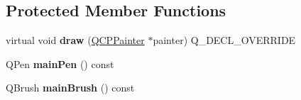 \subsection*{Protected Member Functions}
\begin{DoxyCompactItemize}
\item 
\mbox{\label{classQCPItemTracer_a11f187ffea436434f3b5cfc387811967}} 
virtual void {\bfseries draw} (\hyperlink{classQCPPainter}{Q\+C\+P\+Painter} $\ast$painter) Q\+\_\+\+D\+E\+C\+L\+\_\+\+O\+V\+E\+R\+R\+I\+DE
\item 
\mbox{\label{classQCPItemTracer_abffdcf64d0f84f7b41bd4af07d144642}} 
Q\+Pen {\bfseries main\+Pen} () const
\item 
\mbox{\label{classQCPItemTracer_a94f81c54197577e86c53a60cf39155cd}} 
Q\+Brush {\bfseries main\+Brush} () const
\end{DoxyCompactItemize}

